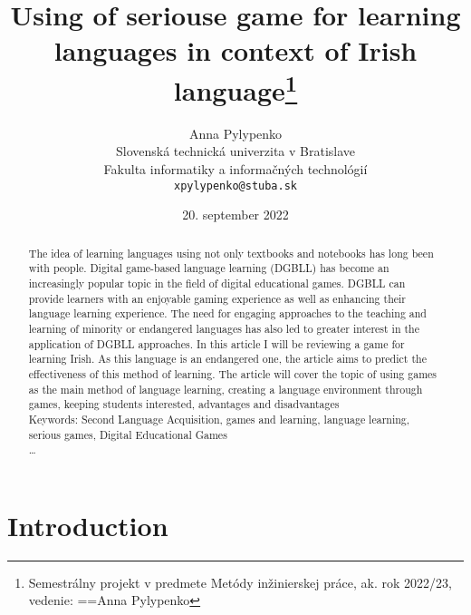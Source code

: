 \documentclass[10pt,twoside,english,a4paper]{article}
\title{Using of seriouse game for learning languages in context of Irish language\thanks{Semestrálny projekt v predmete Metódy inžinierskej práce, ak. rok 2022/23, vedenie: ==Anna Pylypenko}} %
\author{Anna Pylypenko\\[2pt]
	{\small Slovenská technická univerzita v Bratislave}\\
	{\small Fakulta informatiky a informačných technológií}\\
	{\small \texttt{xpylypenko@stuba.sk}}
	}
\date{\small 20. september 2022} %
\begin{document}
\maketitle

\begin{abstract}
The idea of learning languages using not only textbooks and notebooks has long been with people. Digital game-based language learning (DGBLL) has become an increasingly popular topic in the field of digital educational games. DGBLL can provide learners with an enjoyable gaming experience as well as enhancing their language learning experience. The need for engaging approaches to the teaching and learning of minority or endangered languages has also led to greater interest in the application of DGBLL approaches. In this article I will be reviewing a game for learning Irish. As this language is an endangered one, the article aims to predict the effectiveness of this method of learning. The article will cover the topic of using games as the main method of language learning, creating a language environment through games, keeping students interested, advantages and disadvantages\\
Keywords: Second Language Acquisition, games and learning, language learning, serious games, Digital Educational Games\\
\ldots

\end{abstract}


\section{Introduction}
\end{document}
